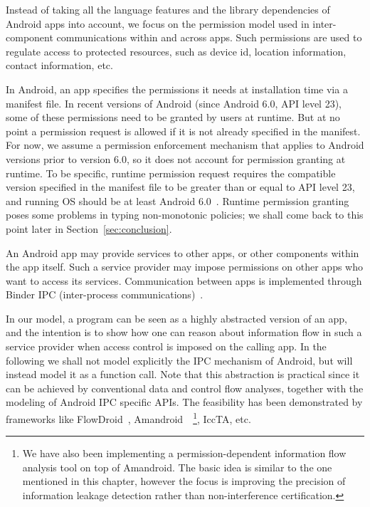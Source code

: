 Instead of taking all the language features and the library dependencies of Android apps into account, we focus on the permission model used in inter-component communications within and across apps. Such permissions are used to regulate access to protected resources, such as device id, location information, contact information, etc.

In Android, an app specifies the permissions it needs at installation time via a manifest file. In recent versions of Android (since Android 6.0, API level 23), some of these permissions need to be granted by users at runtime. But
at no point a permission request is allowed if it is not already specified in the manifest.
For now, we assume a permission enforcement mechanism that applies to Android versions prior to version 6.0, so it does not
account for permission granting at runtime. To be specific, runtime permission request requires the compatible version specified in the manifest file to be greater than or equal to API level 23, and running OS should be at least Android 6.0~\cite{url:android-perm}. Runtime permission granting poses some problems in typing non-monotonic
policies; we shall come back to this point later in Section~\ref{sec:conclusion}.

An Android app may provide services to other apps,
or other components within the app itself. Such a service provider
may impose permissions on other apps who want to
access its services. Communication between apps is implemented
through Binder IPC (inter-process communications)~\cite{Android-Binder-IPC}.

In our model, a program can be seen as a highly abstracted version of an app, and the intention is to show how one can reason about information flow in such a service provider when access control is imposed on the calling app. In the following we shall not model explicitly the IPC mechanism of Android, but will instead model it as a function call. Note that this abstraction is practical since it can be achieved by conventional data and control flow analyses, together with the modeling of Android IPC specific APIs. The feasibility has been demonstrated by frameworks like FlowDroid~\cite{Arzt:2014:FPC:2666356.2594299}, Amandroid~\cite{Wei:2014:APG:2660267.2660357}~\footnote{We have also been implementing a permission-dependent information flow analysis tool on top of Amandroid. The basic idea is similar to the one mentioned in this chapter, however the focus is improving the precision of information leakage detection rather than non-interference certification.}, IccTA\cite{Li:2015:IDI:2818754.2818791}, etc.

